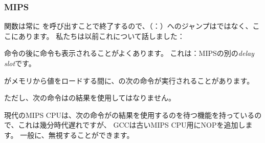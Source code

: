 ﻿\subsubsection{MIPS}




関数は常に \puts を呼び出すことで終了するので、\puts（：）へのジャンプはではなく、ここにあります。
私たちは以前これについて話しました：

命令の後に命令も表示されることがよくあります。
これは：MIPSの別の\emph{delay slot}です。

がメモリから値をロードする間に、の次の命令が実行されることがあります。

ただし、次の命令はの結果を使用してはなりません。

現代のMIPS CPUは、次の命令がの結果を使用するのを待つ機能を持っているので、これは幾分時代遅れですが、
GCCは古いMIPS CPU用にNOPを追加します。
一般に、無視することができます。
